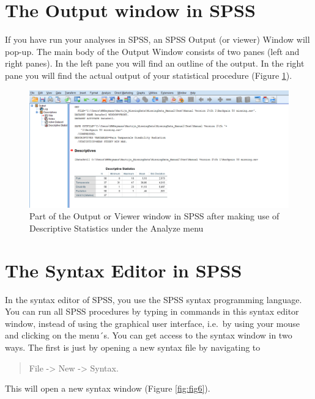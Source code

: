 \documentclass[]{book}
\theoremstyle{definition}
\theoremstyle{definition}
\theoremstyle{definition}
\theoremstyle{remark}
\begin{document}
\section{The Output window in SPSS}\label{the-output-window-in-spss}

If you have run your analyses in SPSS, an SPSS Output (or viewer) Window
will pop-up. The main body of the Output Window consists of two panes
(left and right panes). In the left pane you will find an outline of the
output. In the right pane you will find the actual output of your
statistical procedure (Figure \ref{fig:fig5}).

\begin{figure}

{\centering \includegraphics[width=0.9\linewidth]{images/fig1.5} 

}

\caption{Part of the Output or Viewer window in SPSS after making use of Descriptive Statistics under the Analyze menu}\label{fig:fig5}
\end{figure}

\section{The Syntax Editor in SPSS}\label{the-syntax-editor-in-spss}

In the syntax editor of SPSS, you use the SPSS syntax programming
language. You can run all SPSS procedures by typing in commands in this
syntax editor window, instead of using the graphical user interface,
i.e.~by using your mouse and clicking on the menu´s. You can get access
to the syntax window in two ways. The first is just by opening a new
syntax file by navigating to

\begin{quote}
File -\textgreater{} New -\textgreater{} Syntax.
\end{quote}

This will open a new syntax window (Figure \ref{fig:fig6}).
\end{document}
